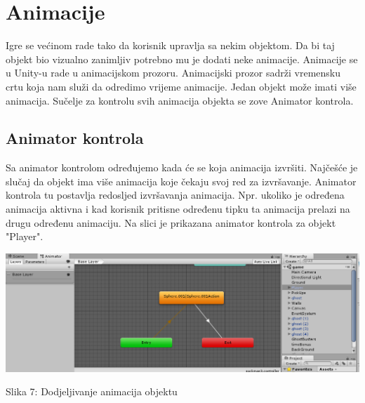 \section{Animacije}
Igre se većinom rade tako da korisnik upravlja sa nekim objektom. Da bi taj objekt bio vizualno zanimljiv potrebno mu je dodati neke animacije. Animacije se u Unity-u rade u animacijskom prozoru. Animacijski prozor sadrži vremensku crtu koja nam služi da odredimo vrijeme animacije. Jedan objekt može imati više animacija.
Sučelje za kontrolu svih animacija objekta se zove Animator kontrola.

\subsection{Animator kontrola}
Sa animator kontrolom određujemo kada će se koja animacija izvršiti. Najčešće je slučaj da objekt ima više animacija koje čekaju svoj red za izvršavanje. Animator kontrola tu postavlja redosljed izvršavanja animacija. Npr. ukoliko je određena animacija aktivna i kad korisnik pritisne određenu tipku ta animacija prelazi na drugu određenu animaciju. Na slici je prikazana animator kontrola za objekt "Player". 


\begin{center}
	\includegraphics[scale=0.60]{animacijaPrimjer.png}
	
	
	Slika 7: Dodjeljivanje animacija objektu
\end{center}